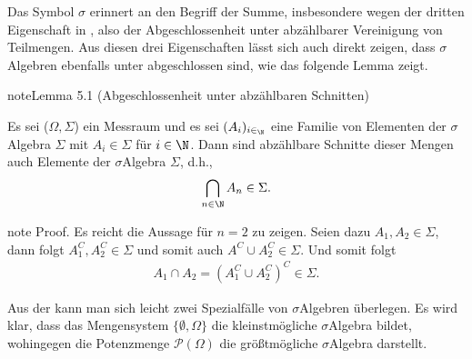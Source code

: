 \documentclass[letterpaper,10pt,german]{jupyterBook}
\begin{document}
\sphinxAtStartPar
Das Symbol \(\sigma\) erinnert an den Begriff der Summe, insbesondere wegen der dritten Eigenschaft in {\hyperref[\detokenize{masstheorie/masstheorie:def:sigmaalgebra}]{}}, also der Abgeschlossenheit unter abzählbarer Vereinigung von Teilmengen.
Aus diesen drei Eigenschaften lässt sich auch direkt zeigen, dass \(\sigma\)\sphinxhyphen{}Algebren ebenfalls unter  abgeschlossen sind, wie das folgende Lemma zeigt.
\label{masstheorie/masstheorie:lemma-1}
\begin{sphinxadmonition}{note}{Lemma 5.1 (Abgeschlossenheit unter abzählbaren Schnitten)}



\sphinxAtStartPar
Es sei (\(\Omega,\Sigma\)) ein Messraum und es sei \((A_i)_{i\in_\N}\) eine Familie von Elementen der \(\sigma\)\sphinxhyphen{}Algebra \(\Sigma\) mit \(A_i \in \Sigma\) für \(i \in \N\).
Dann sind abzählbare Schnitte dieser Mengen auch Elemente der \(\sigma\)\sphinxhyphen{}Algebra \(\Sigma\), d.h.,
\begin{equation*}
\begin{split}\bigcap_{n \in \N} A_n \in \Sigma.\end{split}
\end{equation*}\end{sphinxadmonition}

\begin{sphinxadmonition}{note}
\sphinxAtStartPar
Proof. Es reicht die Aussage für \(n=2\) zu zeigen. Seien dazu \(A_1,A_2\in\Sigma\), dann folgt \(A_1^C,A_2^C\in\Sigma\) und somit auch \(A^C\cup A_2^C\in\Sigma\). Und somit folgt
\begin{equation*}
\begin{split}A_1\cap A_2 = (A_1^C\cup A_2^C)^C \in \Sigma.\end{split}
\end{equation*}\end{sphinxadmonition}

\sphinxAtStartPar
Aus der {\hyperref[\detokenize{masstheorie/masstheorie:def:sigmaalgebra}]{}} kann man sich leicht zwei Spezialfälle von \(\sigma\)\sphinxhyphen{}Algebren überlegen.
Es wird klar, dass das Mengensystem \(\{\emptyset, \Omega\}\) die kleinstmögliche \(\sigma\)\sphinxhyphen{}Algebra bildet, wohingegen die Potenzmenge \(\mathcal{P}(\Omega)\) die größtmögliche \(\sigma\)\sphinxhyphen{}Algebra darstellt.
\end{document}
